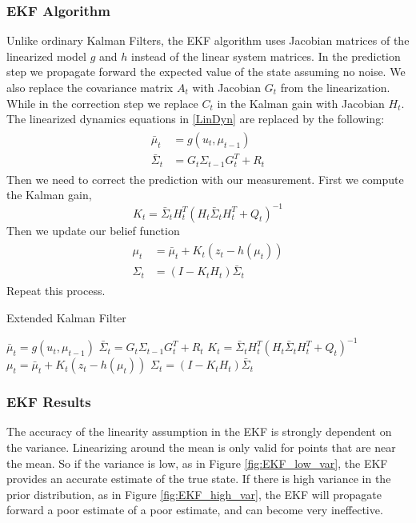 \documentclass[twoside]{article}
\begin{document}
\subsubsection{EKF Algorithm}
Unlike ordinary Kalman Filters, the EKF algorithm uses Jacobian matrices of the linearized model $g$ and $h$ instead of the linear system matrices.
In the prediction step we propagate forward the expected value of the state assuming no noise. We also replace the covariance matrix $A_t$ with Jacobian $G_t$ from the linearization. While in the correction step we replace $C_t$ in the Kalman gain with Jacobian $H_t$. The linearized dynamics equations in \eqref{LinDyn} are replaced by the following:
\begin{align}
\begin{split}
\bar{\mu}_t &= g(u_t,\mu_{t-1})
\\\bar{\Sigma}_t &= G_t\Sigma_{t-1} G_t^{T} + R_t
\end{split}
\end{align}
Then we need to correct the prediction with our measurement. First we compute the Kalman gain,
\begin{equation}
K_t = \bar{\Sigma}_{t}H_t^{T}(H_t\bar{\Sigma}_{t}H_t^{T}+Q_t)^{-1}
\end{equation}
Then we update our belief function
\begin{align}
\begin{split}
\mu_t &= \bar{\mu}_t+K_t(z_t-h(\mu_{t})) \\
\Sigma_t &= (I-K_t H_t)\bar{\Sigma}_t
\end{split}
\end{align}
Repeat this process.

\begin{algorithm}[H]
\caption{Extended Kalman Filter}
	$	\bar{\mu}_t = g(u_t,\mu_{t-1})$\;
	$	\bar{\Sigma}_t = G_t\Sigma_{t-1} G_t^{T} + R_t$\;
	$ 	K_t = \bar{\Sigma}_{t}H_t^{T}(H_t\bar{\Sigma}_{t}H_t^{T}+Q_t)^{-1}$\;
	$    \mu_t = \bar{\mu}_t+K_t(z_t-h(\mu_{t}))$\;
	$   \Sigma_t = (I-K_t H_t)\bar{\Sigma}_t$\;
\end{algorithm}

\subsubsection{EKF Results}
The accuracy of the linearity assumption in the EKF is strongly dependent on the variance. Linearizing around the mean is only valid for points that are near the mean. So if the variance is low, as in Figure \ref{fig:EKF_low_var}, the EKF provides an accurate estimate of the true state. If there is high variance in the prior distribution, as in Figure \ref{fig:EKF_high_var}, the EKF will propagate forward a poor estimate of a poor estimate, and can become very ineffective.
\end{document}
